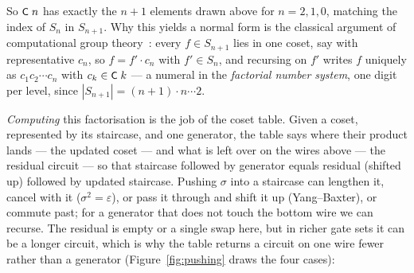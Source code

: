 \noindent So $\mbox{\textsf{\small C}}\;n$ has exactly the $n{+}1$ elements drawn above
for $n = 2, 1, 0$, matching the index of $S_n$ in $S_{n+1}$.  Why this yields
a normal form is the classical argument of computational group
theory~\cite{sims1994computation,holt2005handbook}:
every $f \in S_{n+1}$ lies in one coset, say with representative $c_n$,
so $f = f' \cdot c_n$ with $f' \in S_n$, and recursing on $f'$ writes $f$
uniquely as $c_1 c_2 \cdots c_n$ with $c_k \in \mbox{\textsf{\small C}}\;k$ --- a numeral
in the \emph{factorial number system}, one digit per level, since
$|S_{n+1}| = (n{+}1) \cdot n \cdots 2$.

\emph{Computing} this factorisation is the job of the coset table.
Given a coset, represented by its staircase, and one generator, the
table says where their product lands --- the updated coset --- and what
is left over on the wires above --- the residual circuit --- so that
staircase followed by generator equals residual (shifted up) followed by
updated staircase.
Pushing $\sigma$ into a staircase can lengthen it, cancel with it ($\sigma^2 =
\varepsilon$), or pass it through and shift it up (Yang--Baxter), or
commute past; for a generator that does not touch the bottom wire we can
recurse.  The residual is empty or a single swap here, but in richer
gate sets it can be a longer circuit, which is why the table returns a
circuit on one wire fewer rather than a generator
(Figure~\ref{fig:pushing} draws the four cases):

